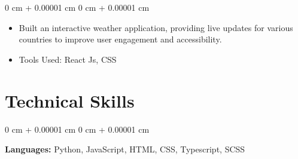 \documentclass[10pt, letterpaper]{article}
\newenvironment{highlights}{
    \begin{itemize}[
        topsep=0.10 cm,
        parsep=0.10 cm,
        partopsep=0pt,
        itemsep=0pt,
        leftmargin=0 cm + 10pt
    ]
}{
    \end{itemize}
} %
\newenvironment{highlightsforbulletentries}{
    \begin{itemize}[
        topsep=0.10 cm,
        parsep=0.10 cm,
        partopsep=0pt,
        itemsep=0pt,
        leftmargin=10pt
    ]
}{
    \end{itemize}
} %
\newenvironment{onecolentry}{
    \begin{adjustwidth}{
        0 cm + 0.00001 cm
    }{
        0 cm + 0.00001 cm
    }
}{
    \end{adjustwidth}
} %
\begin{document}
        \vspace{0.10 cm}
        \begin{onecolentry}
            \begin{highlights}
                \item Built an interactive weather application, providing live updates for various countries to improve user engagement and accessibility.
                \item Tools Used: React Js, CSS
            \end{highlights}
        \end{onecolentry}
    










    \section{Technical Skills}
        
        \begin{onecolentry}
            \textbf{Languages:} Python, JavaScript, HTML, CSS, Typescript, SCSS
        \end{onecolentry}
\end{document}
